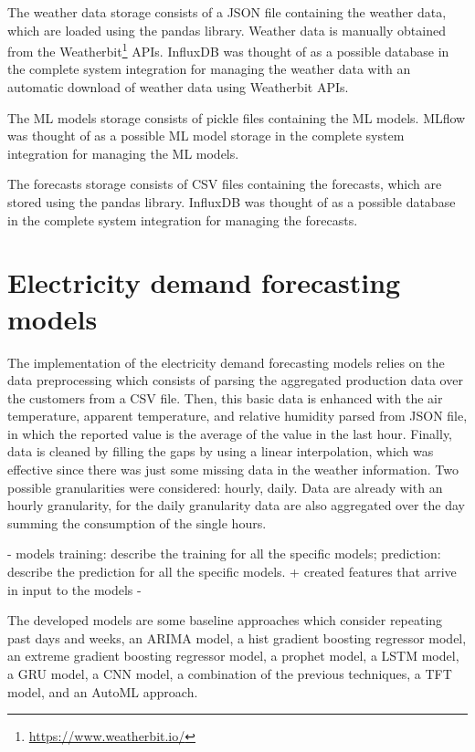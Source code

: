 The weather data storage consists of a JSON file containing the weather data, which are loaded using the pandas library.
Weather data is manually obtained from the Weatherbit\footnote{ \url{https://www.weatherbit.io/} } APIs.
InfluxDB was thought of as a possible database in the complete system integration for managing the weather data with an automatic download of weather data using Weatherbit APIs.

The ML models storage consists of pickle files containing the ML models.
MLflow was thought of as a possible ML model storage in the complete system integration for managing the ML models.

The forecasts storage consists of CSV files containing the forecasts, which are stored using the pandas library.
InfluxDB was thought of as a possible database in the complete system integration for managing the forecasts.


\section{Electricity demand forecasting models}
\label{sec:demandimpl}
\vspace{0.2 cm}

The implementation of the electricity demand forecasting models relies on the data preprocessing which consists of parsing the aggregated production data over the customers from a CSV file.
Then, this basic data is enhanced with the air temperature, apparent temperature, and relative humidity parsed from JSON file, in which the reported value is the average of the value in the last hour.
Finally, data is cleaned by filling the gaps by using a linear interpolation, which was effective since there was just some missing data in the weather information.
Two possible granularities were considered: hourly, daily.
Data are already with an hourly granularity, for the daily granularity data are also aggregated over the day summing the consumption of the single hours.


- models training: describe the training for all the specific models;
prediction: describe the prediction for all the specific models.
+ created features that arrive in input to the models -


The developed models are some baseline approaches which consider repeating past days and weeks, an ARIMA model, a hist gradient boosting regressor model, an extreme gradient boosting regressor model, a prophet model, a LSTM model, a GRU model, a CNN model, a combination of the previous techniques, a TFT model, and an AutoML approach.

